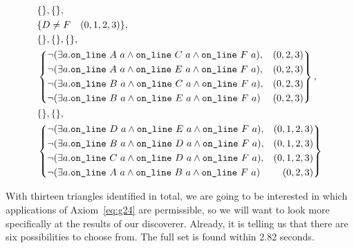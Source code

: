 {\begin{minipage}{\linewidth}
\begin{displaymath}
\begin{split}
    &\{\},\{\},\\
    &\{D\neq F \quad (0,1,2,3)\},\\
    &\{\},\{\},\{\},\\
    &\left\{\begin{aligned} 
        &\Triangle{a}{A}{C}{F}, & (0,2,3)\\
        &\Triangle{a}{A}{E}{F}, & (0,2,3)\\
        &\Triangle{a}{B}{C}{F}, & (0,2,3)\\
        &\Triangle{a}{B}{E}{F} & (0,2,3)\end{aligned}\right\},\\
    &\{\},\{\},\\
    &\left\{\begin{aligned} 
        &\Triangle{a}{D}{E}{F}, & (0,1,2,3)\\
        &\Triangle{a}{B}{D}{F}, & (0,1,2,3)\\
        &\Triangle{a}{C}{D}{F}, & (0,1,2,3)\\
        &\Triangle{a}{A}{B}{F} & (0,2,3)\end{aligned}\right\}
\end{split}
\end{displaymath}
\end{minipage}}
\linebreak

With thirteen triangles identified in total, we are going to be interested in which applications of Axiom~\ref{eq:g24} are permissible, so we will want to look more specifically at the results of our  discoverer. Already, it is telling us that there are six possibilities to choose from. The full set is found within 2.82 seconds.

